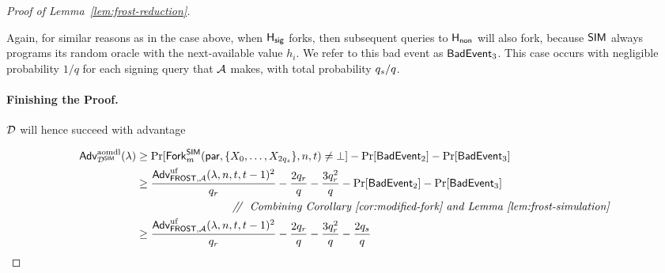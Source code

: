 \begin{proof}[Proof of Lemma~\ref{lem:frost-reduction}]
\begin{case}[$
a_{i0} = a_{i1},
c_{i0} \neq c_{i1}
$]
Again,
for similar reasons as in the case above,
when $\mathsf{H_{sig}}$ forks,
then subsequent queries to $\mathsf{H_{non}}$ will also fork,
because $\mathsf{SIM}$ always programs its random oracle with the next-available value $h_i$.
We refer to this bad event as $\mathsf{BadEvent}_3$.
%
This case occurs with negligible probability $1/q$ for each signing query that $\mathcal{A}$ makes,
with total probability $q_s/q$.
\end{case}


  \paragraph{Finishing the Proof.}

  $\mathcal{D}$ will hence succeed with advantage

    \begin{align*}
    \begin{split}
      \textsf{\upshape Adv}^{\textrm{\upshape aomdl}}_{\mathcal{D}^{\mathsf{SIM}}}(\lambda)
      & \geq \Pr[ \mathsf{Fork}_m^{\mathsf{SIM}}(\mathsf{par}, \{ X_0, \ldots, X_{2q_s}\}, n, t) \neq \bot ]
        - \Pr[ \mathsf{BadEvent}_2 ]
        - \Pr[ \mathsf{BadEvent}_3 ]
      \\
      & \geq
        \frac{\textsf{\upshape Adv}^{\textrm{\upshape uf}}_{\mathsf{FROST},\mathcal{A}}(\lambda, n, t, t-1)^2}{q_r}
        - \frac{2q_r}{q}
        - \frac{3q_r^2}{q}
        - \Pr[ \mathsf{BadEvent}_2 ]
        - \Pr[ \mathsf{BadEvent}_3 ]
        \\
        & \qquad \qquad \qquad \qquad \text{\em\ \ /\!/ \ Combining Corollary~\ref{cor:modified-fork}
        and Lemma~\ref{lem:frost-simulation} }
        \\
        & \geq
        \frac{\textsf{\upshape Adv}^{\textrm{\upshape uf}}_{\mathsf{FROST},\mathcal{A}}(\lambda, n, t, t-1)^2}{q_r}
        - \frac{2q_r}{q}
        - \frac{3q_r^2}{q}
        - \frac{2 q_s}{q}
    \end{split}
    \end{align*}


\end{proof}
